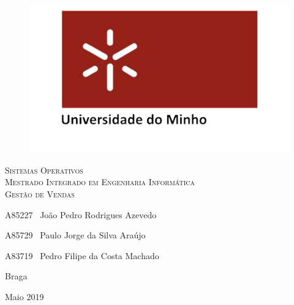 \documentclass[a4paper,11pt]{report}
\begin{document}


\begin{titlepage}
    \center
    {

    \begin{figure}[t]
        \centering
        \includegraphics[scale=0.4]{uminho.png}
        \label{img:logo}
        \vspace{2.0cm}
    \end{figure}

    \vspace{3.0cm}
    \textsc{\huge Sistemas Operativos}\\[0.5cm]
    \textsc{\Large{Mestrado Integrado em Engenharia Informática}}\\[0.5cm]
    \vspace{4.0cm}
    \textsc{\Huge{Gestão de Vendas}}\\[0.5cm]
    \vspace{5.0cm}
    \begin{flushleft}
        \vspace{2.0cm}

        \large A85227 \,\,\,João Pedro Rodrigues Azevedo
        \vspace{0.2cm}

        A85729 \,\,\,Paulo Jorge da Silva Araújo
        \vspace{0.2cm}

        A83719 \,\,\,Pedro Filipe da Costa Machado
    \end{flushleft}
        \vspace{1cm}
    \begin{flushright}
        Braga

        Maio 2019
    \end{flushright}

\date{\today}
}
\end{titlepage}
\end{document}
